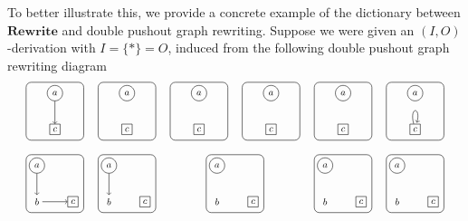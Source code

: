 \documentclass{tac}
\newcommand{\cat}[1]{\mathbf{#1}}
\begin{document}
To better illustrate this, we provide a concrete 
example of the dictionary between $\cat{Rewrite}$ and 
double pushout graph rewriting.  
Suppose we were given an $(I,O)$-derivation with 
	$ I = \{ \ast \} = O $, 
induced from the following double pushout graph rewriting diagram
\[
	\begin{tikzpicture} 
	\draw[rounded corners] (-0.3,1.7) rectangle (1.3,3.3);
	\draw[rounded corners] (1.7,1.7) rectangle (3.3,3.3);
	\draw[rounded corners] (3.7,1.7) rectangle (5.3,3.3);
	\draw[rounded corners] (5.7,1.7) rectangle (7.3,3.3);
	\draw[rounded corners] (7.7,1.7) rectangle (9.3,3.3);
	\draw[rounded corners] (9.7,1.7) rectangle (11.3,3.3);
	\draw[rounded corners] (-0.3,-0.3) rectangle (1.3,1.3);
	\draw[rounded corners] (1.7,-0.3) rectangle (3.3,1.3);
	\draw[rounded corners] (4.7,-0.3) rectangle (6.3,1.3);
	\draw[rounded corners] (7.7,-0.3) rectangle (9.3,1.3);
	\draw[rounded corners] (9.7,-0.3) rectangle (11.3,1.3);
	\node[draw,circle,scale=0.75] (a1) at (0.5,3) {$a$};
	\node[draw,rectangle,scale=0.75] (c1) at (0.5,2) {$c$};
	\node[draw,circle,scale=0.75] (a2) at (2.5,3) {$a$};
	\node[draw,rectangle,scale=0.75] (c2) at (2.5,2) {$c$};
	\node[draw,circle,scale=0.75] (a3) at (4.5,3) {$a$};
	\node[draw,rectangle,scale=0.75] (c3) at (4.5,2) {$c$};
	\node[draw,circle,scale=0.75] (a4) at (6.5,3) {$a$};
	\node[draw,rectangle,scale=0.75] (c4) at (6.5,2) {$c$};
	\node[draw,circle,scale=0.75] (a5) at (8.5,3) {$a$};
	\node[draw,rectangle,scale=0.75] (c5) at (8.5,2) {$c$};
	\node[draw,circle,scale=0.75] (a6) at (10.5,3) {$a$};
	\node[draw,rectangle,scale=0.75] (c6) at (10.5,2) {$c$};
	\node[draw,circle,scale=0.75] (a7) at (0,1) {$a$};
	\node[scale=0.75] (b1) at (0,0) {$b$};
	\node[draw,rectangle,scale=0.75] (c7) at (1,0) {$c$};
	\node[draw,circle,scale=0.75] (a8) at (2,1) {$a$};
	\node[scale=0.75] (b2) at (2,0) {$b$};
	\node[draw,rectangle,scale=0.75] (c8) at (3,0) {$c$};
	\node[draw,circle,scale=0.75] (a9) at (5,1) {$a$};
	\node[scale=0.75] (b3) at (5,0) {$b$};
	\node[draw,rectangle,scale=0.75] (c9) at (6,0) {$c$};
	\node[draw,circle,scale=0.75] (a10) at (8,1) {$a$};
	\node[scale=0.75] (b4) at (8,0) {$b$};
	\node[draw,rectangle,scale=0.75] (c10) at (9,0) {$c$};
	\node[draw,circle,scale=0.75] (a11) at (10,1) {$a$};
	\node[scale=0.75] (b5) at (10,0) {$b$};
	\node[draw,rectangle,scale=0.75] (c11) at (11,0) {$c$};
	\draw [->] (a1) -- (c1);
	\draw (c6) edge [loop above] (c6);
	\draw [->] (a7) -- (b1);
	\draw [->] (b1) -- (c7);
	\draw [->] (a8) -- (b2);

\end{tikzpicture}\]
\end{document}
